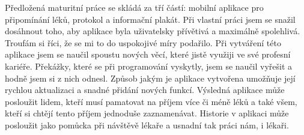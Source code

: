 \documentclass[../TakeYourPill.tex]{subfiles}
\begin{document}
Předložená maturitní práce se skládá za tří částí: mobilní aplikace pro připomínání léků, protokol a informační plakát. Při vlastní práci jsem se snažil dosáhnout toho, aby aplikace byla uživatelsky přívětivá a maximálně spolehlivá. Troufám si říci, že se mi to do uspokojivé míry podařilo. Při vytváření této aplikace jsem se naučil spoustu nových věcí, které jistě využiji ve své profesní kariéře. Překážky, které se při programování vyskytly, jsem se naučil vyřešit a hodně jsem si z nich odnesl. Způsob jakým je aplikace vytvořena umožňuje její rychlou aktualizaci a snadné přidání nových funkcí. Výsledná aplikace může posloužit lidem, kteří musí pamatovat na příjem více či méně léků a také všem, kteří si chtějí tento příjem jednoduše zaznamenávat. Historie v aplikaci může posloužit jako pomůcka při návštěvě lékaře a usnadní tak práci nám, i lékaři.
\end{document}

